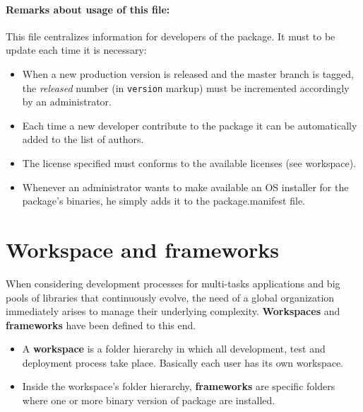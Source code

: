 \documentclass[12pt,a4paper]{article}
\begin{document}
\paragraph{Remarks about usage of this file:}

This file centralizes information for developers of the package. It must to be update each time it is necessary:
\begin{itemize}
\item When a new production version is released and the master branch is tagged, the \textit{released} number (in \texttt{version} markup) must be incremented accordingly by an administrator.
\item Each time a new developer contribute to the package it can be automatically added to the list of authors.
\item The license specified must conforms to the available licenses (see workspace).
\item Whenever an administrator wants to make available an OS installer for the package's binaries, he simply adds it to the package.manifest file.
\end{itemize} 

\pagebreak

\section{Workspace and frameworks}

When considering development processes for multi-tasks applications and big pools of libraries that continuously evolve, the need of a global organization immediately arises to manage their underlying complexity. \textbf{Workspaces} and \textbf{frameworks} have been defined to this end.
\begin{itemize}
\item A \textbf{workspace} is a folder hierarchy in which all development, test and deployment process take place. Basically each user has its own workspace.
\item Inside the workspace's folder hierarchy, \textbf{frameworks} are specific folders where one or more binary version of package are installed.
\end{itemize}
\end{document}
